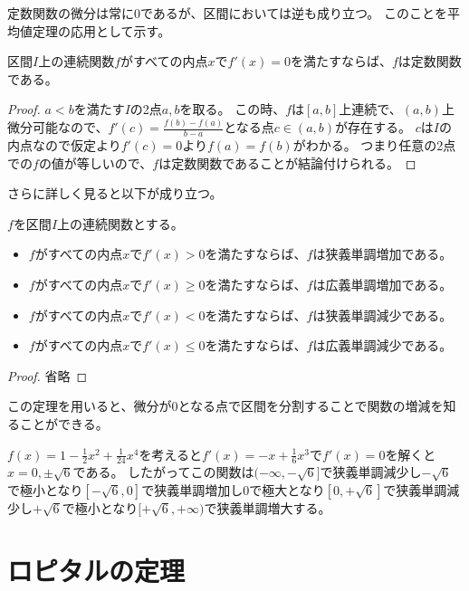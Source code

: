 定数関数の微分は常に$0$であるが、区間においては逆も成り立つ。
このことを平均値定理の応用として示す。

\begin{theorem}
区間$I$上の連続関数$f$がすべての内点$x$で$f'(x) = 0$を満たすならば、$f$は定数関数である。
\end{theorem}

\begin{proof}
$a < b$を満たす$I$の2点$a, b$を取る。
この時、$f$は$[a, b]$上連続で、$(a, b)$上微分可能なので、$f'(c) = \frac{f(b)-f(a)}{b-a}$となる点$c \in (a, b)$が存在する。
$c$は$I$の内点なので仮定より$f'(c) = 0$より$f(a) = f(b)$がわかる。
つまり任意の2点での$f$の値が等しいので、$f$は定数関数であることが結論付けられる。
\end{proof}

さらに詳しく見ると以下が成り立つ。

\begin{theorem}
$f$を区間$I$上の連続関数とする。
\begin{itemize}
\item
$f$がすべての内点$x$で$f'(x) > 0$を満たすならば、$f$は狭義単調増加である。
\item
$f$がすべての内点$x$で$f'(x) \ge 0$を満たすならば、$f$は広義単調増加である。
\item
$f$がすべての内点$x$で$f'(x) < 0$を満たすならば、$f$は狭義単調減少である。
\item
$f$がすべての内点$x$で$f'(x) \le 0$を満たすならば、$f$は広義単調減少である。
\end{itemize}
\end{theorem}

\begin{proof}
省略
\end{proof}

この定理を用いると、微分が$0$となる点で区間を分割することで関数の増減を知ることができる。

\begin{example}
$f(x) = 1-\frac{1}{2}x^2+\frac{1}{24}x^4$を考えると$f'(x) = -x+\frac{1}{6}x^3$で$f'(x) = 0$を解くと$x = 0, \pm\sqrt{6}$である。
したがってこの関数は$(-\infty, -\sqrt{6}]$で狭義単調減少し$-\sqrt{6}$で極小となり$[-\sqrt{6}, 0]$で狭義単調増加し$0$で極大となり$[0, +\sqrt{6}]$で狭義単調減少し$+\sqrt{6}$で極小となり$[+\sqrt{6}, +\infty)$で狭義単調増大する。
\end{example}

\section{ロピタルの定理}

